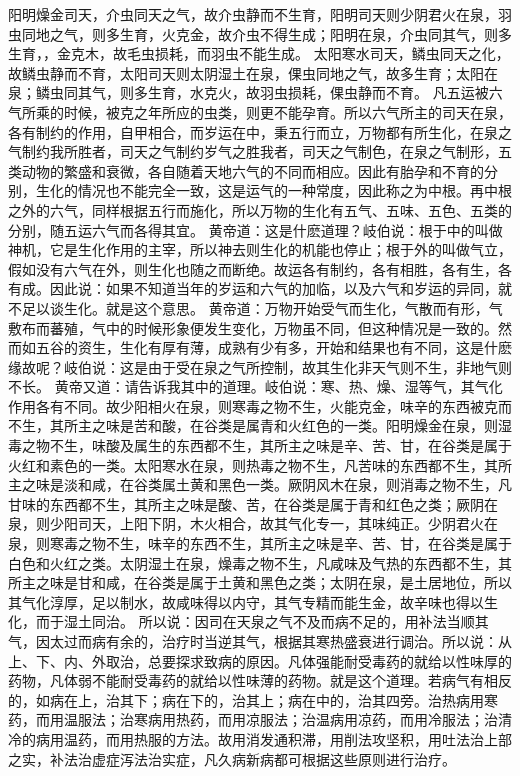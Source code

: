 \documentclass[12pt,UTF8]{ctexbook}
\begin{document}
阳明燥金司天，介虫同天之气，故介虫静而不生育，阳明司天则少阴君火在泉，羽虫同地之气，则多生育，火克金，故介虫不得生成；阳明在泉，介虫同其气，则多生育，，金克木，故毛虫损耗，而羽虫不能生成。
太阳寒水司天，鳞虫同天之化，故鳞虫静而不育，太阳司天则太阴湿土在泉，倮虫同地之气，故多生育；太阳在泉；鳞虫同其气，则多生育，水克火，故羽虫损耗，倮虫静而不育。
凡五运被六气所乘的时候，被克之年所应的虫类，则更不能孕育。所以六气所主的司天在泉，各有制约的作用，自甲相合，而岁运在中，秉五行而立，万物都有所生化，在泉之气制约我所胜者，司天之气制约岁气之胜我者，司天之气制色，在泉之气制形，五类动物的繁盛和衰微，各自随着天地六气的不同而相应。因此有胎孕和不育的分别，生化的情况也不能完全一致，这是运气的一种常度，因此称之为中根。再中根之外的六气，同样根据五行而施化，所以万物的生化有五气、五味、五色、五类的分别，随五运六气而各得其宜。
黄帝道：这是什麽道理？岐伯说：根于中的叫做神机，它是生化作用的主宰，所以神去则生化的机能也停止；根于外的叫做气立，假如没有六气在外，则生化也随之而断绝。故运各有制约，各有相胜，各有生，各有成。因此说：如果不知道当年的岁运和六气的加临，以及六气和岁运的异同，就不足以谈生化。就是这个意思。
黄帝道：万物开始受气而生化，气散而有形，气敷布而蕃殖，气中的时候形象便发生变化，万物虽不同，但这种情况是一致的。然而如五谷的资生，生化有厚有薄，成熟有少有多，开始和结果也有不同，这是什麽缘故呢？岐伯说：这是由于受在泉之气所控制，故其生化非天气则不生，非地气则不长。
黄帝又道：请告诉我其中的道理。岐伯说：寒、热、燥、湿等气，其气化作用各有不同。故少阳相火在泉，则寒毒之物不生，火能克金，味辛的东西被克而不生，其所主之味是苦和酸，在谷类是属青和火红色的一类。阳明燥金在泉，则湿毒之物不生，味酸及属生的东西都不生，其所主之味是辛、苦、甘，在谷类是属于火红和素色的一类。太阳寒水在泉，则热毒之物不生，凡苦味的东西都不生，其所主之味是淡和咸，在谷类属土黄和黑色一类。厥阴风木在泉，则消毒之物不生，凡甘味的东西都不生，其所主之味是酸、苦，在谷类是属于青和红色之类；厥阴在泉，则少阳司天，上阳下阴，木火相合，故其气化专一，其味纯正。少阴君火在泉，则寒毒之物不生，味辛的东西不生，其所主之味是辛、苦、甘，在谷类是属于白色和火红之类。太阴湿土在泉，燥毒之物不生，凡咸味及气热的东西都不生，其所主之味是甘和咸，在谷类是属于土黄和黑色之类；太阴在泉，是土居地位，所以其气化淳厚，足以制水，故咸味得以内守，其气专精而能生金，故辛味也得以生化，而于湿土同治。
所以说：因司在天泉之气不及而病不足的，用补法当顺其气，因太过而病有余的，治疗时当逆其气，根据其寒热盛衰进行调治。所以说：从上、下、内、外取治，总要探求致病的原因。凡体强能耐受毒药的就给以性味厚的药物，凡体弱不能耐受毒药的就给以性味薄的药物。就是这个道理。若病气有相反的，如病在上，治其下；病在下的，治其上；病在中的，治其四旁。治热病用寒药，而用温服法；治寒病用热药，而用凉服法；治温病用凉药，而用冷服法；治清冷的病用温药，而用热服的方法。故用消发通积滞，用削法攻坚积，用吐法治上部之实，补法治虚症泻法治实症，凡久病新病都可根据这些原则进行治疗。
\end{document}
